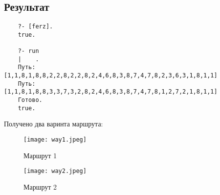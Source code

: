 \subsection{Результат}
\begin{verbatim}
    ?- [ferz].
    true.

    ?- run
    |    .
    Путь: [1,1,8,1,8,8,2,2,8,2,2,8,2,4,6,8,3,8,7,4,7,8,2,3,6,3,1,8,1,1]
    Путь: [1,1,8,1,8,8,3,3,7,3,2,8,2,4,6,8,3,8,7,4,7,8,1,2,7,2,1,8,1,1]
    Готово.
    true.
\end{verbatim}

Получено два варинта маршрута:

\begin{figure}[H]
\centering
\texttt{[image: way1.jpeg]}
\caption{Маршрут 1}
\texttt{[image: way2.jpeg]}
\caption{Маршрут 2}
\label{img:ways}
\end{figure}
